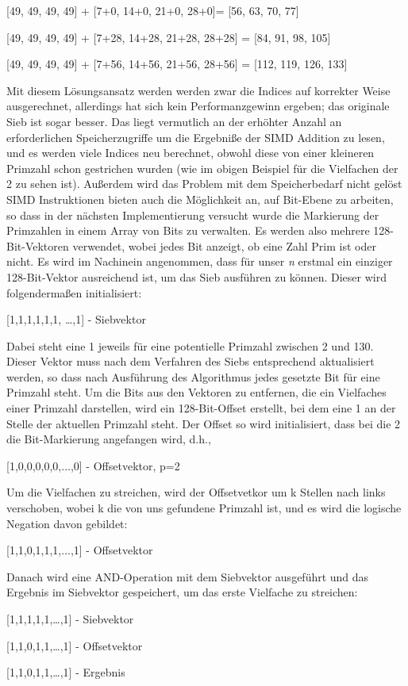 \documentclass[course=erap]{aspdoc}
\begin{document}
\begin{center}
    [49, 49, 49, 49] + [7+0, 14+0, 21+0, 28+0]= [56, 63, 70, 77]
\end{center}
\begin{center}
[49, 49, 49, 49] + [7+28, 14+28, 21+28, 28+28] = [84, 91, 98, 105]
\end{center}
\begin{center}
[49, 49, 49, 49] + [7+56, 14+56, 21+56, 28+56] = [112, 119, 126, 133]
\end{center} Mit diesem Lösungsansatz werden werden zwar die Indices auf korrekter Weise ausgerechnet, allerdings hat sich kein Performanzgewinn ergeben; das originale Sieb ist sogar besser. Das liegt vermutlich an der erhöhter Anzahl an erforderlichen Speicherzugriffe um die Ergebniße der SIMD Addition zu lesen, und es werden viele Indices neu berechnet, obwohl diese von einer kleineren Primzahl schon gestrichen wurden (wie im obigen Beispiel für die Vielfachen der 2 zu sehen ist). Außerdem wird das Problem mit dem Speicherbedarf nicht gelöst\\
SIMD Instruktionen bieten auch die Möglichkeit an, auf Bit-Ebene zu arbeiten, so dass in der nächsten Implementierung versucht wurde die Markierung der Primzahlen in einem Array von Bits zu verwalten. Es werden also mehrere 128-Bit-Vektoren verwendet, wobei jedes Bit anzeigt, ob eine Zahl Prim ist oder nicht. Es wird im Nachinein angenommen, dass für unser \textit{n} erstmal ein einziger 128-Bit-Vektor ausreichend ist, um das Sieb ausführen zu können.  Dieser wird folgendermaßen initialisiert: \begin{center}[1,1,1,1,1,1, …,1] - Siebvektor\end{center}
Dabei steht eine 1 jeweils für eine potentielle Primzahl zwischen 2 und 130.
Dieser Vektor muss nach dem Verfahren des Siebs entsprechend aktualisiert werden, so dass nach Ausführung des Algorithmus jedes gesetzte Bit für eine Primzahl steht. Um die Bits aus den Vektoren zu entfernen, die ein Vielfaches einer Primzahl darstellen, wird ein 128-Bit-Offset erstellt, bei dem eine 1 an der Stelle der aktuellen Primzahl steht. Der Offset so wird initialisiert, dass bei die 2 die Bit-Markierung angefangen wird, d.h.,  \begin{center} [1,0,0,0,0,0,...,0]  - Offsetvektor, p=2 \end{center}
Um die Vielfachen zu streichen, wird der Offsetvetkor um k Stellen nach links verschoben, wobei k die von uns gefundene Primzahl ist, und es wird die logische Negation davon gebildet: 
\begin{center} [1,1,0,1,1,1,...,1]  - Offsetvektor \end{center} Danach wird eine AND-Operation mit dem Siebvektor ausgeführt und das Ergebnis im Siebvektor gespeichert, um das erste Vielfache zu streichen: \begin{center}[1,1,1,1,1,…,1] -  Siebvektor\end{center} \begin{center}[1,1,0,1,1,…,1] - Offsetvektor \end{center} \begin{center}[1,1,0,1,1,…,1] -  Ergebnis\end{center}
\end{document}
